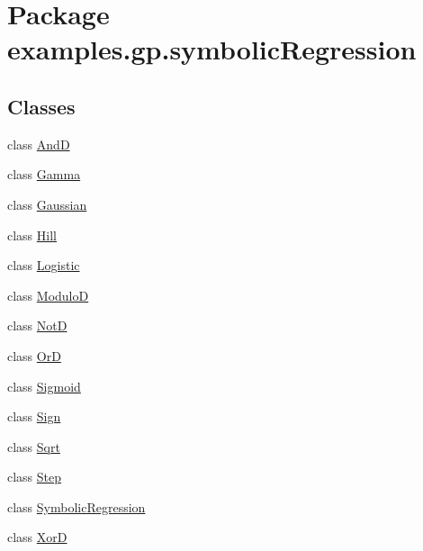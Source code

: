 \hypertarget{namespaceexamples_1_1gp_1_1symbolic_regression}{\section{Package examples.\-gp.\-symbolic\-Regression}
\label{namespaceexamples_1_1gp_1_1symbolic_regression}
}
\subsection*{Classes}
\begin{DoxyCompactItemize}
\item 
class \hyperlink{classexamples_1_1gp_1_1symbolic_regression_1_1_and_d}{And\-D}
\item 
class \hyperlink{classexamples_1_1gp_1_1symbolic_regression_1_1_gamma}{Gamma}
\item 
class \hyperlink{classexamples_1_1gp_1_1symbolic_regression_1_1_gaussian}{Gaussian}
\item 
class \hyperlink{classexamples_1_1gp_1_1symbolic_regression_1_1_hill}{Hill}
\item 
class \hyperlink{classexamples_1_1gp_1_1symbolic_regression_1_1_logistic}{Logistic}
\item 
class \hyperlink{classexamples_1_1gp_1_1symbolic_regression_1_1_modulo_d}{Modulo\-D}
\item 
class \hyperlink{classexamples_1_1gp_1_1symbolic_regression_1_1_not_d}{Not\-D}
\item 
class \hyperlink{classexamples_1_1gp_1_1symbolic_regression_1_1_or_d}{Or\-D}
\item 
class \hyperlink{classexamples_1_1gp_1_1symbolic_regression_1_1_sigmoid}{Sigmoid}
\item 
class \hyperlink{classexamples_1_1gp_1_1symbolic_regression_1_1_sign}{Sign}
\item 
class \hyperlink{classexamples_1_1gp_1_1symbolic_regression_1_1_sqrt}{Sqrt}
\item 
class \hyperlink{classexamples_1_1gp_1_1symbolic_regression_1_1_step}{Step}
\item 
class \hyperlink{classexamples_1_1gp_1_1symbolic_regression_1_1_symbolic_regression}{Symbolic\-Regression}
\item 
class \hyperlink{classexamples_1_1gp_1_1symbolic_regression_1_1_xor_d}{Xor\-D}
\end{DoxyCompactItemize}
